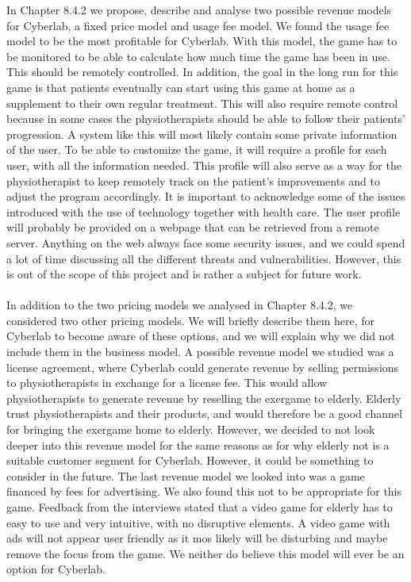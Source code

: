In Chapter 8.4.2 we propose, describe and analyse two possible revenue models for Cyberlab, a fixed price model and usage fee model. We found the usage fee model to be the most profitable for Cyberlab. With this model, the game has to be monitored to be able to calculate how much time the game has been in use. This should be remotely controlled. In addition, the goal in the long run for this game is that patients eventually can start using this game at home as a supplement to their own regular treatment. This will also require remote control because in some cases the physiotherapists should be able to follow their patients’ progression. A system like this will most likely contain some private information of the user. To be able to customize the game, it will require a profile for each user, with all the information needed. This profile will also serve as a way for the physiotherapist to keep remotely track on the patient’s improvements and to adjust the program accordingly. It is important to acknowledge some of the issues introduced with the use of technology together with health care. The user profile will probably be provided on a webpage that can be retrieved from a remote server. Anything on the web always face some security issues, and we could spend a lot of time discussing all the different threats and vulnerabilities. However, this is out of the scope of this project and is rather a subject for future work. \\ \\ 
In addition to the two pricing models we analysed in Chapter 8.4.2, we considered two other pricing models. We will briefly describe them here, for Cyberlab to become aware of these options, and we will explain why we did not include them in the business model. A possible revenue model we studied was a license agreement, where Cyberlab could generate revenue by selling permissions to physiotherapists in exchange for a license fee. This would allow physiotherapists to generate revenue by reselling the exergame to elderly. Elderly trust physiotherapists and their products, and would therefore be a good channel for bringing the exergame home to elderly. However, we decided to not look deeper into this revenue model for the same reasons as for why elderly not is a suitable customer segment for Cyberlab. However, it could be something to consider in the future. The last revenue model we looked into was a game financed by fees for advertising. We also found this not to be appropriate for this game. Feedback from the interviews stated that a video game for elderly has to easy to use and very intuitive, with no disruptive elements. A video game with ads will not appear user friendly as it mos likely will be disturbing and maybe remove the focus from the game. We neither do believe this model will ever be an option for Cyberlab. \\ \\
